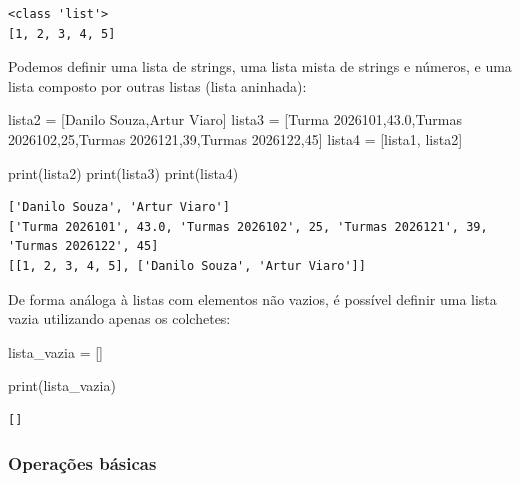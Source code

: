 \documentclass[
  brazilian,
  letterpaper,
  DIV=11,
  numbers=noendperiod]{scrreprt}
\newenvironment{Shaded}{\begin{snugshade}}{\end{snugshade}}
\newcommand{\BuiltInTok}[1]{\textcolor[rgb]{0.00,0.23,0.31}{#1}}
\newcommand{\DecValTok}[1]{\textcolor[rgb]{0.68,0.00,0.00}{#1}}
\newcommand{\FloatTok}[1]{\textcolor[rgb]{0.68,0.00,0.00}{#1}}
\newcommand{\NormalTok}[1]{\textcolor[rgb]{0.00,0.23,0.31}{#1}}
\newcommand{\OperatorTok}[1]{\textcolor[rgb]{0.37,0.37,0.37}{#1}}
\newcommand{\StringTok}[1]{\textcolor[rgb]{0.13,0.47,0.30}{#1}}
\begin{document}
\begin{verbatim}
<class 'list'>
[1, 2, 3, 4, 5]
\end{verbatim}

Podemos definir uma lista de strings, uma lista mista de strings e
números, e uma lista composto por outras listas (lista aninhada):

\begin{Shaded}
\begin{Highlighting}[]
\NormalTok{lista2 }\OperatorTok{=}\NormalTok{ [}\StringTok{\textquotesingle{}Danilo Souza\textquotesingle{}}\NormalTok{,}\StringTok{\textquotesingle{}Artur Viaro\textquotesingle{}}\NormalTok{]}
\NormalTok{lista3 }\OperatorTok{=}\NormalTok{ [}\StringTok{\textquotesingle{}Turma 2026101\textquotesingle{}}\NormalTok{,}\FloatTok{43.0}\NormalTok{,}\StringTok{\textquotesingle{}Turmas 2026102\textquotesingle{}}\NormalTok{,}\DecValTok{25}\NormalTok{,}\StringTok{\textquotesingle{}Turmas 2026121\textquotesingle{}}\NormalTok{,}\DecValTok{39}\NormalTok{,}\StringTok{\textquotesingle{}Turmas 2026122\textquotesingle{}}\NormalTok{,}\DecValTok{45}\NormalTok{]}
\NormalTok{lista4 }\OperatorTok{=}\NormalTok{ [lista1, lista2]}

\BuiltInTok{print}\NormalTok{(lista2)}
\BuiltInTok{print}\NormalTok{(lista3)}
\BuiltInTok{print}\NormalTok{(lista4)}
\end{Highlighting}
\end{Shaded}

\begin{verbatim}
['Danilo Souza', 'Artur Viaro']
['Turma 2026101', 43.0, 'Turmas 2026102', 25, 'Turmas 2026121', 39, 'Turmas 2026122', 45]
[[1, 2, 3, 4, 5], ['Danilo Souza', 'Artur Viaro']]
\end{verbatim}

De forma análoga à listas com elementos não vazios, é possível definir
uma lista vazia utilizando apenas os colchetes:

\begin{Shaded}
\begin{Highlighting}[]
\NormalTok{lista\_vazia }\OperatorTok{=}\NormalTok{ []}

\BuiltInTok{print}\NormalTok{(lista\_vazia)}
\end{Highlighting}
\end{Shaded}

\begin{verbatim}
[]
\end{verbatim}

\subsubsection{Operações básicas}\label{operauxe7uxf5es-buxe1sicas-1}
\end{document}
